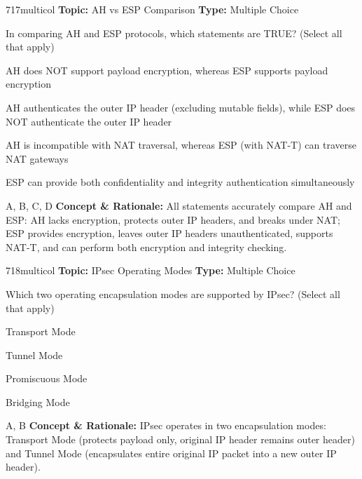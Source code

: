 \begin{qcard}{717}{multicol}
\textcolor{darkslate!75}{\small\textbf{Topic:} AH vs ESP Comparison \hfill \textbf{Type:} Multiple Choice}\vspace{0.4em}\par
In comparing AH and ESP protocols, which statements are TRUE? (Select all that apply)
\begin{qoptions}
\item AH does NOT support payload encryption, whereas ESP supports payload encryption
\item AH authenticates the outer IP header (excluding mutable fields), while ESP does NOT authenticate the outer IP header
\item AH is incompatible with NAT traversal, whereas ESP (with NAT-T) can traverse NAT gateways
\item ESP can provide both confidentiality and integrity authentication simultaneously
\end{qoptions}
\end{qcard}
\nopagebreak
\begin{explainbox}{A, B, C, D}
\textbf{Concept \& Rationale:} All statements accurately compare AH and ESP: AH lacks encryption, protects outer IP headers, and breaks under NAT; ESP provides encryption, leaves outer IP headers unauthenticated, supports NAT-T, and can perform both encryption and integrity checking.
\end{explainbox}

\begin{qcard}{718}{multicol}
\textcolor{darkslate!75}{\small\textbf{Topic:} IPsec Operating Modes \hfill \textbf{Type:} Multiple Choice}\vspace{0.4em}\par
Which two operating encapsulation modes are supported by IPsec? (Select all that apply)
\begin{qoptions}
\item Transport Mode
\item Tunnel Mode
\item Promiscuous Mode
\item Bridging Mode
\end{qoptions}
\end{qcard}
\nopagebreak
\begin{explainbox}{A, B}
\textbf{Concept \& Rationale:} IPsec operates in two encapsulation modes: Transport Mode (protects payload only, original IP header remains outer header) and Tunnel Mode (encapsulates entire original IP packet into a new outer IP header).
\end{explainbox}

